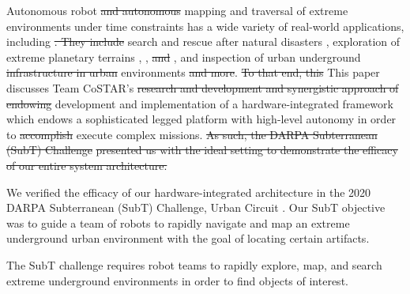 \documentclass[letterpaper, 10pt, conference]{ieeeconf}      %
\newcommand{\rev}[1]{{\color{blue}#1}} %
\begin{document}
\rev{Autonomous} robot \st{and autonomous} mapping and traversal of extreme environments under time constraints has a wide variety of real-world applications\rev{, including} \st{. They include} search and rescue after natural disasters \cite{Nagatani2013}, exploration of extreme planetary terrains \cite{ali-agu}, \cite{Taka2020JFR}, \st{and} \cite{Husain2013}, \rev{and} inspection of urban underground \st{infrastructure in urban} environments \cite{Kolvenbach2020} \st{and more}.
\st{To that end, this} \rev{This} paper discusses Team CoSTAR's \st{research and development and synergistic approach of endowing} \rev{development and implementation of a hardware-integrated framework which endows} a sophisticated legged platform with high-level autonomy in order to \st{accomplish} \rev{execute} complex missions. %
\st{As such, the DARPA Subterranean (SubT) Challenge} \cite{subt_webpage} \st{presented us with the ideal setting to demonstrate the efficacy of our entire system architecture.}

\rev{We verified the efficacy of our hardware-integrated architecture in the 2020 DARPA Subterranean (SubT) Challenge, Urban Circuit \cite{subt_webpage}. Our SubT objective was to guide a team of robots to rapidly navigate and map an extreme underground urban environment with the goal of locating certain artifacts.


}
The SubT challenge requires robot teams to rapidly explore, map, and search extreme underground environments in order to find objects of interest.


\end{document}
